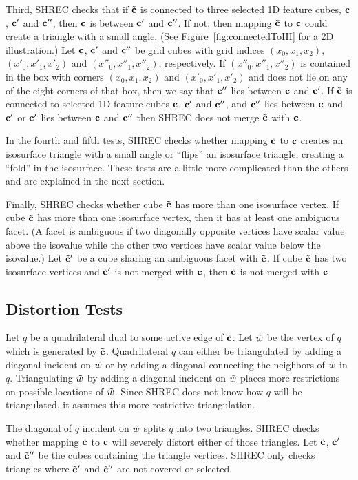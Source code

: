 Third, SHREC checks that if ${\tilde{\mathbf{c}}}$ is connected to three selected 1D feature cubes,
$\mathbf{c}$, $\mathbf{c}'$ and $\mathbf{c}''$, then $\mathbf{c}$ is between $\mathbf{c}'$ and $\mathbf{c}''$.
If not, then mapping ${\tilde{\mathbf{c}}}$ to $\mathbf{c}$ could create a triangle 
with a small angle.
(See Figure~\ref{fig:connectedToIII} for a 2D illustration.)
Let $\mathbf{c}$, $\mathbf{c}'$ and $\mathbf{c}''$ be grid cubes with grid indices
$(x_0,x_1,x_2)$, $(x'_0,x'_1,x'_2)$ and $(x''_0,x''_1,x''_2)$, respectively.
If $(x''_0,x''_1,x''_2)$ is contained in the box with corners
$(x_0,x_1,x_2)$ and $(x'_0,x'_1,x'_2)$ and does not lie on any 
of the eight corners of that box,
then we say that $\mathbf{c}''$ lies between $\mathbf{c}$ and $\mathbf{c}'$.
If ${\tilde{\mathbf{c}}}$ is connected to selected 1D feature cubes $\mathbf{c}$, $\mathbf{c}'$ and $\mathbf{c}''$,
and $\mathbf{c}''$ lies between $\mathbf{c}$ and $\mathbf{c}'$
or $\mathbf{c}'$ lies between $\mathbf{c}$ and $\mathbf{c}''$
then SHREC does not merge ${\tilde{\mathbf{c}}}$ with $\mathbf{c}$.

In the fourth and fifth tests,
SHREC checks whether mapping ${\tilde{\mathbf{c}}}$ to $\mathbf{c}$ creates an isosurface triangle 
with a small angle or ``flips'' an isosurface triangle,
creating a ``fold'' in the isosurface.
These tests are a little more complicated than the others
and are explained in the next section.

Finally, SHREC checks whether cube ${\tilde{\mathbf{c}}}$ has more than one isosurface vertex.
If cube ${\tilde{\mathbf{c}}}$ has more than one isosurface vertex,
then it has at least one ambiguous facet.
(A facet is ambiguous if two diagonally opposite vertices have
scalar value above the isovalue while the other two vertices
have scalar value below the isovalue.)
Let ${\tilde{\mathbf{c}}}'$ be a cube sharing an ambiguous facet with ${\tilde{\mathbf{c}}}$.
If cube ${\tilde{\mathbf{c}}}$ has two isosurface vertices and 
${\tilde{\mathbf{c}}}'$ is not merged with $\mathbf{c}$, then ${\tilde{\mathbf{c}}}$ is not merged with $\mathbf{c}$.

\subsection{Distortion Tests}
\label{section:distortion_tests}

Let $q$ be a quadrilateral dual to some active edge of ${\tilde{\mathbf{c}}}$.
Let $\tilde{w}$ be the vertex of $q$ which is generated by ${\tilde{\mathbf{c}}}$.
Quadrilateral $q$ can either be triangulated by adding a diagonal
incident on $\tilde{w}$ or by adding a diagonal connecting the neighbors
of $\tilde{w}$ in $q$.
Triangulating $\tilde{w}$ by adding a diagonal incident on $\tilde{w}$
places more restrictions on possible locations of $\tilde{w}$.
Since SHREC does not know how $q$ will be triangulated,
it assumes this more restrictive triangulation.

The diagonal of $q$ incident on $\tilde{w}$ splits $q$ into two triangles.
SHREC checks whether mapping ${\tilde{\mathbf{c}}}$ to $\mathbf{c}$ will severely distort
either of those triangles.
Let ${\tilde{\mathbf{c}}}$, ${\tilde{\mathbf{c}}}'$ and ${\tilde{\mathbf{c}}}''$ be the cubes 
containing the triangle vertices.
SHREC only checks triangles where ${\tilde{\mathbf{c}}}'$ and ${\tilde{\mathbf{c}}}''$ 
are not covered or selected.

